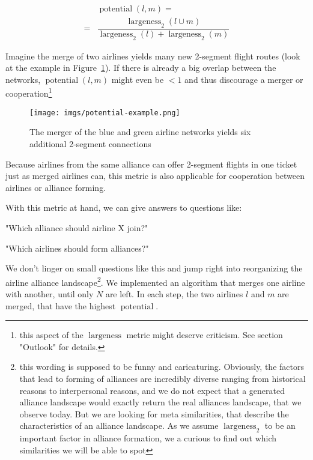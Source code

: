 \documentclass[twocolumn]{tum-article}
\DeclareMathOperator{\Largeness}{largeness}
\DeclareMathOperator{\Potential}{potential}
\begin{document}
\begin{equation}
\begin{aligned}
& \Potential(l,m) = \\
={} & \dfrac{\Largeness_{2}(l \cup m)}{\Largeness_{2}(l) + \Largeness_{2}(m)} 
\end{aligned}
\end{equation}

Imagine the merge of two airlines yields many new 2-segment flight routes (look at the example in Figure~\ref{fig:potential-example}). If there is already a big overlap between the networks, $\Potential(l,m)$ might even be $< 1$ and thus discourage a merger or cooperation\footnote{this aspect of the $\Largeness$ metric might deserve criticism. See section "Outlook" for details.} 

\begin{figure}
	\centering
	\texttt{[image: imgs/potential-example.png]}
	\caption{
The merger of the blue and green airline networks yields six additional 2-segment connections}
	\label{fig:potential-example}
\end{figure}

Because airlines from the same alliance can offer 2-segment flights in one ticket just as merged airlines can, this metric is also applicable for cooperation between airlines or alliance forming. 


With this metric at hand, we can give answers to questions like: 

"Which alliance should airline X join?"

"Which airlines should form alliances?" 


We don't linger on small questions like this and jump right into reorganizing the airline alliance landscape\footnote{this wording is supposed to be funny and caricaturing. Obviously, the factors that lead to forming of alliances are incredibly diverse ranging from historical reasons to interpersonal reasons, and we do not expect that a generated alliance landscape would exactly return the real alliances landscape, that we observe today. But we are looking for meta similarities, that describe the characteristics of an alliance landscape. As we assume $\Largeness_{2}$ to be an important factor in alliance formation, we a curious to find out which similarities we will be able to spot}. We implemented an algorithm that merges one airline with another, until only $N$ are left. In each step, the two airlines $l$ and $m$ are merged, that have the highest $\Potential$.
\end{document}
